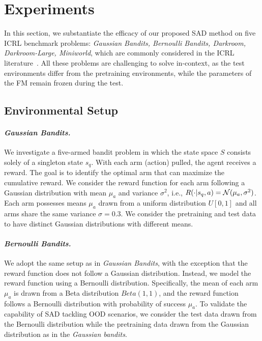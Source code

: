 %
%
\section{Experiments}








In this section, we substantiate the efficacy of our proposed SAD method on five ICRL benchmark problems: \textit{Gaussian Bandits, Bernoulli Bandits, Darkroom, Darkroom-Large, Miniworld}, which are commonly considered in the ICRL literature~\citep{laskin2022context, lee2024supervised, dong2024context}.
%
All these problems are challenging to solve in-context, as the test environments differ from the pretraining environments, while the parameters of the FM  remain frozen during the test.




\subsection{Environmental Setup}
\label{appendix_experiment_detail_env_setup}

\paragraph{\textit{Gaussian Bandits.}}
%
We investigate a five-armed bandit problem in which the state space $S$ consists solely of a singleton state $s_q$.
%
With each arm (action) pulled, the agent receives a reward. The goal is to identify the optimal arm that can maximize the cumulative reward.
%
We consider the reward function for each arm following a Gaussian distribution with mean $\mu_a$ and variance $\sigma^2$, i.e., $R(\cdot | s_q, a) = {\mathcal N} (\mu_a, \sigma^2)$. Each arm possesses means $\mu_a$ drawn from a uniform distribution $U[0, 1]$ and all arms share the same variance $\sigma = 0.3$. We consider the pretraining and test data to have distinct Gaussian distributions with different means.
%


\paragraph{\textit{Bernoulli Bandits.}}
%
We adopt the same setup as in \textit{Gaussian Bandits}, with the exception that the reward function does not follow a Gaussian distribution. Instead, we model the reward function using a Bernoulli distribution. Specifically, the mean of each arm $\mu_a$ is drawn from a Beta distribution $\textit{Beta}(1, 1)$, and the reward function follows a Bernoulli distribution with probability of success $\mu_a$. To validate the capability of SAD tackling OOD scenarios, we consider the test data drawn from the Bernoulli distribution while the pretraining data drawn from the Gaussian distribution as in the \textit{Gaussian bandits}.




